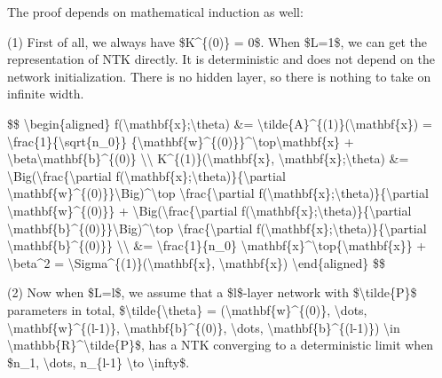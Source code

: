 The proof depends on mathematical induction as well:

(1) First of all, we always have \$K\^{}\{(0)\} = 0\$. When \$L=1\$, we can get the representation of NTK directly. It is deterministic and does not depend on the network initialization. There is no hidden layer, so there is nothing to take on infinite width.

\$\$ \textbackslash begin\{aligned\} f(\textbackslash mathbf\{x\};\textbackslash theta) \&= \textbackslash tilde\{A\}\^{}\{(1)\}(\textbackslash mathbf\{x\}) = \textbackslash frac\{1\}\{\textbackslash sqrt\{n\_0\}\} \{\textbackslash mathbf\{w\}\^{}\{(0)\}\}\^{}\textbackslash top\textbackslash mathbf\{x\} + \textbackslash beta\textbackslash mathbf\{b\}\^{}\{(0)\} \textbackslash\textbackslash{} K\^{}\{(1)\}(\textbackslash mathbf\{x\}, \textbackslash mathbf\{x\}\textquotesingle;\textbackslash theta) \&= \textbackslash Big(\textbackslash frac\{\textbackslash partial f(\textbackslash mathbf\{x\}\textquotesingle;\textbackslash theta)\}\{\textbackslash partial \textbackslash mathbf\{w\}\^{}\{(0)\}\}\textbackslash Big)\^{}\textbackslash top \textbackslash frac\{\textbackslash partial f(\textbackslash mathbf\{x\};\textbackslash theta)\}\{\textbackslash partial \textbackslash mathbf\{w\}\^{}\{(0)\}\} + \textbackslash Big(\textbackslash frac\{\textbackslash partial f(\textbackslash mathbf\{x\}\textquotesingle;\textbackslash theta)\}\{\textbackslash partial \textbackslash mathbf\{b\}\^{}\{(0)\}\}\textbackslash Big)\^{}\textbackslash top \textbackslash frac\{\textbackslash partial f(\textbackslash mathbf\{x\};\textbackslash theta)\}\{\textbackslash partial \textbackslash mathbf\{b\}\^{}\{(0)\}\} \textbackslash\textbackslash{} \&= \textbackslash frac\{1\}\{n\_0\} \textbackslash mathbf\{x\}\^{}\textbackslash top\{\textbackslash mathbf\{x\}\textquotesingle\} + \textbackslash beta\^{}2 = \textbackslash Sigma\^{}\{(1)\}(\textbackslash mathbf\{x\}, \textbackslash mathbf\{x\}\textquotesingle) \textbackslash end\{aligned\} \$\$

(2) Now when \$L=l\$, we assume that a \$l\$-layer network with \$\textbackslash tilde\{P\}\$ parameters in total, \$\textbackslash tilde\{\textbackslash theta\} = (\textbackslash mathbf\{w\}\^{}\{(0)\}, \textbackslash dots, \textbackslash mathbf\{w\}\^{}\{(l-1)\}, \textbackslash mathbf\{b\}\^{}\{(0)\}, \textbackslash dots, \textbackslash mathbf\{b\}\^{}\{(l-1)\}) \textbackslash in \textbackslash mathbb\{R\}\^{}\textbackslash tilde\{P\}\$, has a NTK converging to a deterministic limit when \$n\_1, \textbackslash dots, n\_\{l-1\} \textbackslash to \textbackslash infty\$.


